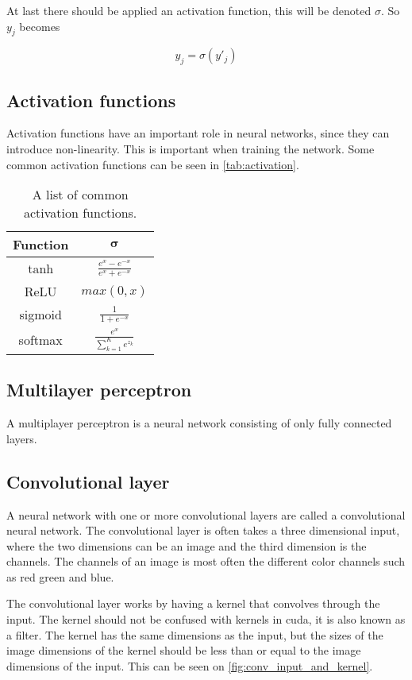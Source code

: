 At last there should be applied an activation function, this will be denoted $\sigma$.
So $y_j$ becomes

$$y_j = \sigma \left(y'_j\right)$$

\subsection{Activation functions}%
\label{sub:Activation functions}

Activation functions have an important role in neural networks, since they can introduce non-linearity. This is important when training the network.
Some common activation functions can be seen in \autoref{tab:activation}.

\begin{table}[H]
\centering
\begin{tabular}{|c|c|}\hline
\textbf{Function} & $\bm{\sigma}$ \\\hline
tanh     & $\frac{e^x - e^{-x}}{e^x + e^{-x}}$ \\\hline
ReLU     & $max(0, x)$ \\\hline
sigmoid  & $\frac{1}{1+e^{-x}}$ \\\hline
softmax  & $\frac{e^x}{\sum^K_{k=1} e^{z_k}}$ \\\hline
\end{tabular}
\caption{A list of common activation functions.}
\label{tab:activation}
\end{table}

\subsection{Multilayer perceptron}%
\label{sub:Multilayer perceptron}

A multiplayer perceptron is a neural network consisting of only fully connected layers.

\subsection{Convolutional layer}

A neural network with one or more convolutional layers are called a convolutional neural network.
The convolutional layer is often takes a three dimensional input, where the two dimensions can be an image and the third dimension is the channels. The channels of an image is most often the different color channels such as red green and blue.

The convolutional layer works by having a kernel that convolves through the input. The kernel should not be confused with kernels in cuda, it is also known as a filter. The kernel has the same dimensions as the input, but the sizes of the image dimensions of the kernel should be less than or equal to the image dimensions of the input. This can be seen on \autoref{fig:conv_input_and_kernel}.

